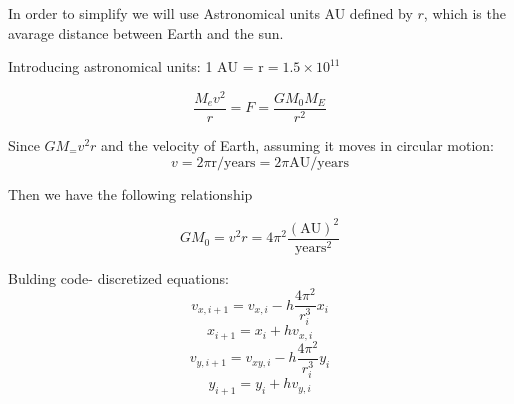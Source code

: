 \documentclass[../main.tex]{subfiles}
\begin{document}
In order to simplify we will use Astronomical units AU defined by $r$, which is the avarage distance between Earth and the sun.

Introducing astronomical units: 1 $\text{AU = r} = 1.5 \times 10^{11}$

\begin{equation}
  \frac{M_ev^2}{r} = F = \frac{GM_0M_E}{r^2}
\end{equation}

Since $GM_=  v^2r$ and the velocity of Earth, assuming it moves in circular motion: $$v = 2\pi \text{r/years}= 2\pi \text{AU/years}$$

Then we have the following relationship

$$GM_0 = v^2r = 4\pi^2 \frac{(\text{AU})^2}{\text{years}^2}$$

Bulding code- discretized equations:
$$v_{x,i+1} = v_{x,i} - h \frac{4\pi^2}{r_i^3}x_i$$
$$x_{i+1} = x_{i} + hv_{x,i}$$
$$v_{y,i+1} = v_{xy,i} - h \frac{4\pi^2}{r_i^3}y_i$$
$$y_{i+1} = y_{i} + hv_{y,i}$$
\end{document}
